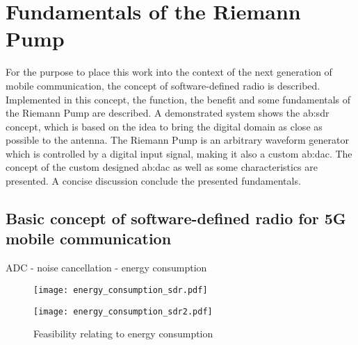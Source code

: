 \chapter{Fundamentals of the Riemann Pump}
\label{ch:fundamentals}
For the purpose to place this work into the context of the next generation of mobile communication, the concept of software-defined radio is described.
Implemented in this concept, the function, the benefit and some fundamentals of the Riemann Pump are described. 
A demonstrated system shows the \gls{ab:sdr} concept, which is based on the idea to bring the digital domain as close as possible to the antenna.
The Riemann Pump is an arbitrary waveform generator which is controlled by a digital input signal, making it also a custom \gls{ab:dac}.
The concept of the custom designed \gls{ab:dac} as well as some characteristics are presented.
A concise discussion conclude the presented fundamentals.

\section{Basic concept of software-defined radio for 5G mobile communication}
ADC - noise cancellation - energy consumption

\begin{figure}[htbp]
	\begin{minipage}{0.48\textwidth} 
	\texttt{[image: energy\_consumption\_sdr.pdf]}
	\label{energy1} 
	\end{minipage}
	\hfill
	\begin{minipage}{0.48\textwidth}
	\texttt{[image: energy\_consumption\_sdr2.pdf]}
	\label{energy2} 
	\end{minipage}
 \caption{Feasibility relating to energy consumption}
\end{figure}

